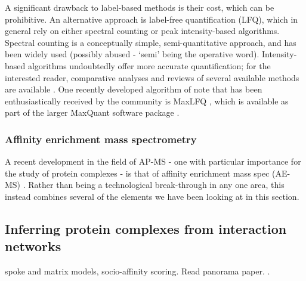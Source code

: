 \documentclass[a4paper,11pt,twoside,openright]{scrbook}
\begin{document}
A significant drawback to label-based methods is their cost, which can be prohibitive. An alternative approach is label-free quantification (LFQ), which in general rely on either spectral counting \cite{Liu2004,Zybailov2005} or peak intensity-based algorithms. Spectral counting is a conceptually simple, semi-quantitative approach, and has been widely used (possibly abused \cite{Lundgren2010} - `semi' being the operative word). Intensity-based algorithms undoubtedly offer more accurate quantification; for the interested reader, comparative analyses and reviews of several available methods are available \cite{Nahnsen2013,Fabre2014}. One recently developed algorithm of note that has been enthusiastically received by the community is MaxLFQ \cite{Cox2014}, which is available as part of the larger MaxQuant software package \cite{Cox2008}.


\subsubsection{Affinity enrichment mass spectrometry}
A recent development in the field of AP-MS - one with particular importance for the study of protein complexes - is that of affinity enrichment mass spec (AE-MS) \cite{Keilhauer2015}. Rather than being a technological break-through in any one area, this instead combines several of the elements we have been looking at in this section.


\subsection{Inferring protein complexes from interaction networks}
spoke and matrix models, socio-affinity scoring. Read panorama paper. \cite{Wan2015}.
\end{document}
